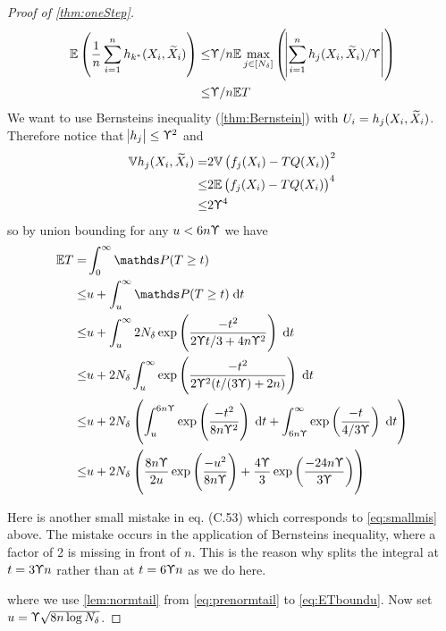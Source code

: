 \begin{proof}[Proof of \cref{thm:oneStep}]
  \begin{align}
    \mathbb{E} \left( \frac{1}{n} \sum_{i=1}^n h_{k^*}(X_i, \widetilde{X}_i) \right)
    \leq & \Upupsilon/n \mathbb{E} \max_{j \in [N_\delta]} \left(
    \abs{\sum_{i=1}^n h_j(X_i, \widetilde{X}_i)/\Upupsilon} \right)
    \\ \leq & \Upupsilon/n \mathbb{E} T 
    \label{eq:havgbound}
  \end{align}
  We want to use Bernsteins inequality (\cref{thm:Bernstein}) with
  $U_i = h_j(X_i,\widetilde{X}_i)$. Therefore notice that
  $\abs{h_j} \leq \Upupsilon^2$ and
  \begin{align}
    \mathbb{V} h_j(X_i, \widetilde{X}_i) = & 2 \mathbb{V} \left( f_j(X_i) - TQ(X_i) \right)^2
    \\ \leq & 2 \mathbb{E} \left( f_j(X_i) - TQ(X_i) \right)^4
    \\ \leq & 2 \Upupsilon^4
    \label{eq:hvarbound}
  \end{align}
  so by union bounding for any $u < 6 n \Upupsilon$ we have
  \begin{align}
    \E T = & \int_0^\infty \Prob(T \geq t)
    \\ \leq & u + \int_u^\infty \Prob(T \geq t) \difd t
    \\ \leq & u + \int_u^\infty 2 N_\delta
    \exp \left( \frac{-t^2}{2 \Yp t/3 + 4n \Yp^2} \right) \difd t
    \label{eq:smallmis}
    \\ \leq & u + 2 N_\delta \int_u^\infty 
    \exp \left( \frac{-t^2}{2 \Yp^2 (t/(3 \Yp) + 2 n )} \right) \difd t
    \\ \leq & u + 2 N_\delta \left(
      \int_u^{6 n \Yp} \exp \left( \frac{-t^2}{8 n \Yp^2} \right) \difd t
      + \int_{6 n \Yp}^\infty \exp \left( \frac{-t}{4/3 \Yp} \right) \difd t
    \right) 
    \label{eq:prenormtail}
    \\ \leq & u + 2 N_\delta \left(
      \frac{8 n \Yp}{2 u} \exp\left( \frac{-u^2}{8 n \Yp} \right)
      + \frac{4 \Yp}{3} \exp\left( \frac{-24 n \Yp}{3 \Yp} \right)
    \right) 
    \label{eq:ETboundu}
  \end{align}
  \begin{rem}
    Here is another small mistake in  eq. (C.53)
    which corresponds to \cref{eq:smallmis} above.
    The mistake occurs in the application of Bernsteins inequality,
    where a factor of 2 is missing in front of $n$.
    This is the reason why  splits the integral at
    $t=3\Upupsilon n$ rather than at $t=6\Upupsilon n$ as we do here.
  \end{rem}
  where we use \cref{lem:normtail}
  from \cref{eq:prenormtail} to \cref{eq:ETboundu}.
  Now set $u = \Upupsilon \sqrt{8 n \log N_\delta}$.

\end{proof}
